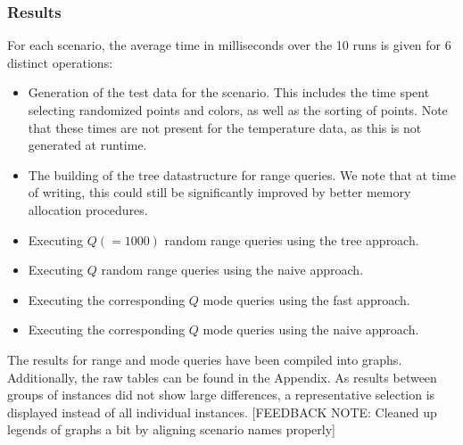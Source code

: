 \documentclass{article}
\newcommand{\fbnote}[1]{{\color{blue}[FEEDBACK NOTE: #1]\\}}
\begin{document}
\subsubsection*{Results}
For each scenario, the average time in milliseconds over the 10 runs is given for 6 distinct operations:
\begin{itemize}
    \item Generation of the test data for the scenario. This includes the time spent
          selecting randomized points and colors, as well as the sorting of points. Note
          that these times are not present for the temperature data, as this is not
          generated at runtime.
    \item The building of the tree datastructure for range queries. We note that at time
          of writing, this could still be significantly improved by better memory
          allocation procedures.
    \item Executing $Q (= 1000)$ random range queries using the tree approach.
    \item Executing $Q$ random range queries using the naive approach.
    \item Executing the corresponding $Q$ mode queries using the fast approach.
    \item Executing the corresponding $Q$ mode queries using the naive approach.
\end{itemize}
The results for range and mode queries have been compiled into graphs. Additionally, the raw tables can be found in the Appendix. As results between groups of instances did not show large differences, a representative selection is displayed instead of all individual instances. \fbnote{Cleaned up legends of graphs a bit by aligning scenario names properly} \\


\end{document}
